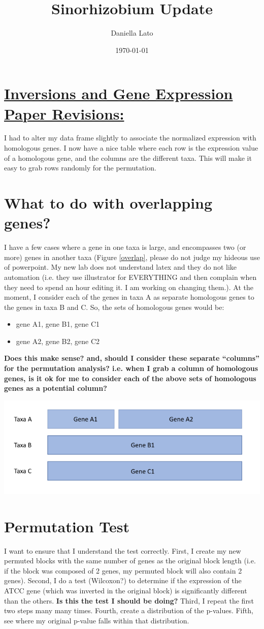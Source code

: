 \documentclass[12pt]{article}
\title{Sinorhizobium Update}
\author{Daniella Lato}
\date{\today}
\begin{document}
\section*{\underline{Inversions and Gene Expression Paper Revisions:}}

I had to alter my data frame slightly to associate the normalized expression with homologous genes. I now have a nice table where each row is the expression value of a homologous gene, and the columns are the different taxa. This will make it easy to grab rows randomly for the permutation.


\section*{What to do with overlapping genes?}
I have a few cases where a gene in one taxa is large, and encompasses two (or more) genes in another taxa (Figure \ref{overlap}, please do not judge my hideous use of powerpoint. My new lab does not understand latex and they do not like automation (i.e. they use illustrator for EVERYTHING and then complain when they need to spend an hour editing it. I am working on changing them.). At the moment, I consider each of the genes in taxa A as separate homologous genes to the genes in taxa B and C. So, the sets of homologous genes would be:
\begin{itemize}
	\item gene A1, gene B1, gene C1
	\item gene A2, gene B2, gene C2
\end{itemize}

\textbf{Does this make sense? and, should I consider these separate ``columns'' for the permutation analysis? i.e. when I grab a column of homologous genes, is it ok for me to consider each of the above sets of homologous genes as a potential column?}

\includegraphics[width=\textwidth]{overlapgenes.png}\label{overlap}

\section*{Permutation Test}
I want to ensure that I understand the test correctly.
First, I create my new permuted blocks with the same number of genes as the original block length (i.e. if the block was composed of 2 genes, my permuted block will also contain 2 genes).
Second, I do a test (Wilcoxon?) to determine if the expression of the ATCC gene (which was inverted in the original block) is significantly different than the others. \textbf{Is this the test I should be doing?}
Third, I repeat the first two steps many many times.
Fourth, create a distribution of the p-values.
Fifth, see where my original p-value falls within that distribution.
\end{document}
